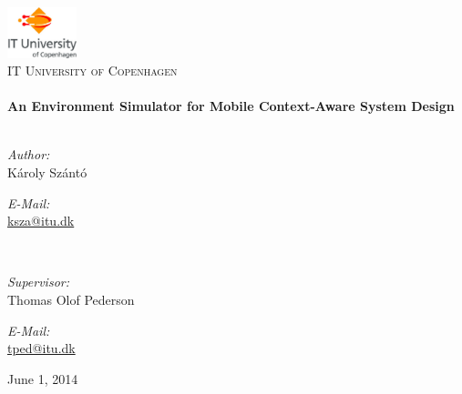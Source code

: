 \begin{titlepage}

\begin{center}


\includegraphics[width=0.15\textwidth]{gfx/itu_logo}\\[1cm]    

\textsc{\LARGE IT University of Copenhagen}\\[2.0cm]

\HRule \\[0.4cm]
{ \huge \bfseries An Environment Simulator for Mobile Context-Aware System Design}\\[0.4cm]

\HRule \\[1.5cm]

\begin{minipage}{0.4\textwidth}
\begin{flushleft} \large
\emph{Author:}\\
K\'aroly Sz\'ant\'o\\
\end{flushleft}
\end{minipage}
\begin{minipage}{0.4\textwidth}
\begin{flushright} \large
\emph{E-Mail:} \\
\href{mailto:ksza@itu.dk}{ksza@itu.dk}\\
\end{flushright}
\end{minipage}\\[0.8cm]

\begin{minipage}{0.4\textwidth}
\begin{flushleft} \large
\emph{Supervisor:}\\
Thomas Olof Pederson\\
\end{flushleft}
\end{minipage}
\begin{minipage}{0.4\textwidth}
\begin{flushright} \large
\emph{E-Mail:} \\
\href{mailto:tped@itu.dk}{tped@itu.dk}\\
\end{flushright}
\end{minipage}

\vfill

{\large June 1, 2014}

\end{center}

\end{titlepage}
